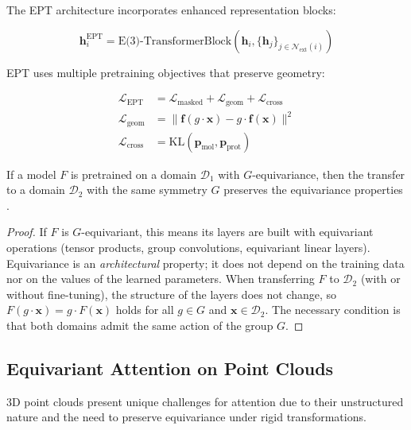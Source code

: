 The EPT architecture incorporates enhanced representation blocks:

\begin{equation}
    \mathbf{h}_i^{\text{EPT}} = \text{E(3)-TransformerBlock}(\mathbf{h}_i, \{\mathbf{h}_j\}_{j \in \mathcal{N}_{\text{ext}}(i)})
    \label{eq:ept_enhanced_block}
\end{equation}

EPT uses multiple pretraining objectives that preserve geometry:

\begin{align}
    \mathcal{L}_{\text{EPT}} &= \mathcal{L}_{\text{masked}} + \mathcal{L}_{\text{geom}} + \mathcal{L}_{\text{cross}} \\
    \mathcal{L}_{\text{geom}} &= \|\mathbf{f}(g \cdot \mathbf{x}) - g \cdot \mathbf{f}(\mathbf{x})\|^2 \\
    \mathcal{L}_{\text{cross}} &= \text{KL}(\mathbf{p}_{\text{mol}}, \mathbf{p}_{\text{prot}})
    \label{eq:ept_loss}
\end{align}

\begin{proposition}
    If a model $F$ is pretrained on a domain $\mathcal{D}_1$ with $G$-equivariance, then the transfer to a domain $\mathcal{D}_2$ with the same symmetry $G$ preserves the equivariance properties \citep{jiao2024ept}.
\end{proposition}

\begin{proof}
If $F$ is $G$-equivariant, this means its layers are built with equivariant operations (tensor products, group convolutions, equivariant linear layers). Equivariance is an \emph{architectural} property; it does not depend on the training data nor on the values of the learned parameters. When transferring $F$ to $\mathcal{D}_2$ (with or without fine-tuning), the structure of the layers does not change, so $F(g \cdot \mathbf{x}) = g \cdot F(\mathbf{x})$ holds for all $g \in G$ and $\mathbf{x} \in \mathcal{D}_2$. The necessary condition is that both domains admit the same action of the group $G$.
\end{proof}

\subsection{Equivariant Attention on Point Clouds}

3D point clouds present unique challenges for attention due to their unstructured nature and the need to preserve equivariance under rigid transformations.

